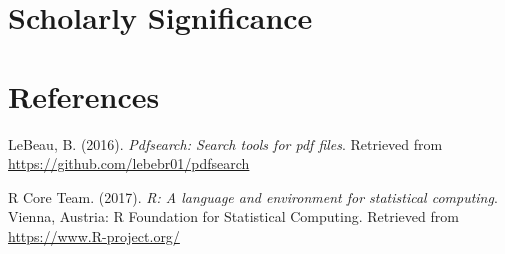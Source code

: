 \documentclass[english,floatsintext,man]{apa6}
\theoremstyle{definition}
\theoremstyle{definition}
\theoremstyle{remark}
\begin{document}
\section{Scholarly Significance}\label{scholarly-significance}

\section*{References}\label{references}

\hypertarget{refs}{}
\hypertarget{ref-pdfsearch}{}
LeBeau, B. (2016). \emph{Pdfsearch: Search tools for pdf files}.
Retrieved from \url{https://github.com/lebebr01/pdfsearch}

\hypertarget{ref-rpro}{}
R Core Team. (2017). \emph{R: A language and environment for statistical
computing}. Vienna, Austria: R Foundation for Statistical Computing.
Retrieved from \url{https://www.R-project.org/}
\end{document}
